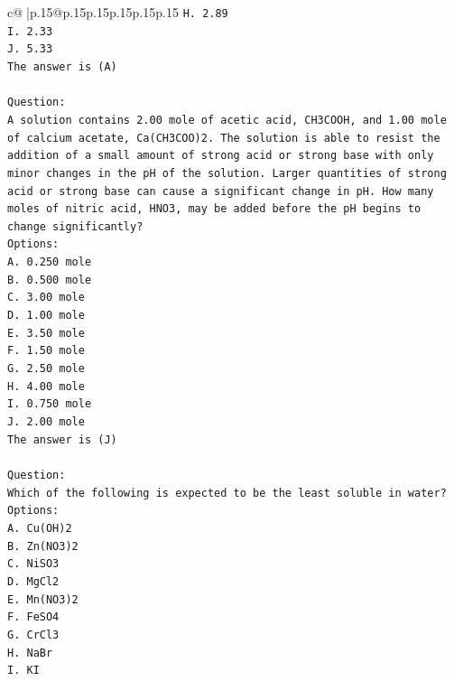 \documentclass{article}
\begin{document}
{\begin{supertabular}{c@{$\;$}|p{.15\linewidth}@{}p{.15\linewidth}p{.15\linewidth}p{.15\linewidth}p{.15\linewidth}p{.15\linewidth}}
{{{\texttt{H. 2.89} \\
\texttt{I. 2.33} \\
\texttt{J. 5.33} \\
\texttt{The answer is (A)} \\
\\ 
\texttt{Question:} \\
\texttt{A solution contains 2.00 mole of acetic acid, CH3COOH, and 1.00 mole of calcium acetate, Ca(CH3COO)2. The solution is able to resist the addition of a small amount of strong acid or strong base with only minor changes in the pH of the solution. Larger quantities of strong acid or strong base can cause a significant change in pH. How many moles of nitric acid, HNO3, may be added before the pH begins to change significantly?} \\
\texttt{Options:} \\
\texttt{A. 0.250 mole} \\
\texttt{B. 0.500 mole} \\
\texttt{C. 3.00 mole} \\
\texttt{D. 1.00 mole} \\
\texttt{E. 3.50 mole} \\
\texttt{F. 1.50 mole} \\
\texttt{G. 2.50 mole} \\
\texttt{H. 4.00 mole} \\
\texttt{I. 0.750 mole} \\
\texttt{J. 2.00 mole} \\
\texttt{The answer is (J)} \\
\\ 
\texttt{Question:} \\
\texttt{Which of the following is expected to be the least soluble in water?} \\
\texttt{Options:} \\
\texttt{A. Cu(OH)2} \\
\texttt{B. Zn(NO3)2} \\
\texttt{C. NiSO3} \\
\texttt{D. MgCl2} \\
\texttt{E. Mn(NO3)2} \\
\texttt{F. FeSO4} \\
\texttt{G. CrCl3} \\
\texttt{H. NaBr} \\
\texttt{I. KI} \\
            }
        }
    }
     \\ \\


\end{supertabular}}
\end{document}
